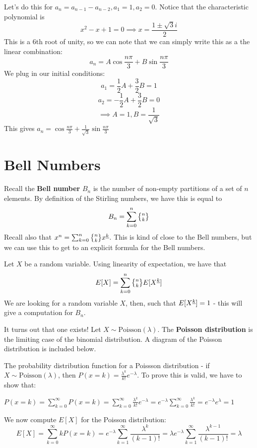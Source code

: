 \documentclass[11pt,twosided]{article}
\begin{document}
Let's do this for $a_n = a_{n-1} - a_{n-2}, a_1 = 1, a_2 = 0$. Notice that the characteristic polynomial is
\[
	x^2 - x + 1 = 0 \implies x = \frac{1 \pm \sqrt{3}i}{2}
\]	
This is a 6th root of unity, so we can note that we can simply write this as a the linear combination: 
\[
	a_n = A \cos \frac{n \pi}{3} + B \sin \frac{n \pi}{3}
\]
We plug in our initial conditions: 
\[
	a_1 = \frac{1}{2} A + \frac{3}{2} B = 1
\]
\[
	a_2 = -\frac{1}{2} A + \frac{3}{2} B = 0
\]
\[
	\implies A = 1, B = \frac{1}{\sqrt{3}}
\]
This gives $a_n = \cos \frac{n \pi}{3} + \frac{1}{\sqrt{3}} \sin \frac{n \pi}{3}$

\section{Bell Numbers}
Recall the \textbf{Bell number} $B_n$ is the number of non-empty partitions of a set of $n$ elements. By definition of the Stirling numbers, we have this is equal to 
\[
	B_n = \sum_{k=0}^n \stirii{n}{k}
\]
Recall also that $x^n = \sum_{k=0}^n \stirii{n}{k} \ffact{x}{k}$. This is kind of close to the Bell numbers, but we can use this to get to an explicit formula for the Bell numbers. 

Let $X$ be a random variable. Using linearity of expectation, we have that 
\[
	E[X] = \sum_{k=0}^n \stirii{n}{k} E[\ffact{X}{k}]
\]	
We are looking for a random variable $X$, then, such that $E[X^{\underline{k}}] = 1$ - this will give a computation for $B_n$.

It turns out that one exists! Let $X \sim \text{Poisson}(\lambda)$. The \textbf{Poisson distribution} is the limiting case of the binomial distribution. A diagram of the Poisson distribution is included below. 


The probability distribution function for a Poissson distribution - if $X \sim \text{Poisson}(\lambda)$, then $P(x = k) = \frac{\lambda^k}{k!}e^{-\lambda}$. To prove this is valid, we have to show that: 

$P(x = k) = \sum_{k=0}^\infty P(x=k) = \sum_{k=0}^\infty \frac{\lambda^k}{k!}e^{-\lambda} = e^{-\lambda} \sum_{k=0}^\infty \frac{\lambda^k}{k!} = e^{-\lambda} e^{\lambda} = 1$

We now compute $E[X]$ for the Poisson distribution: 
\[
E[X] = \sum_{k=0}^\infty k P(x=k) = e^{-\lambda} \sum_{k=1}^\infty \frac{\lambda^k}{(k-1)!} = \lambda e^{-\lambda} \sum_{k=1}^\infty \frac{\lambda^{k-1}}{(k-1)!} = \lambda 
\]
\end{document}
